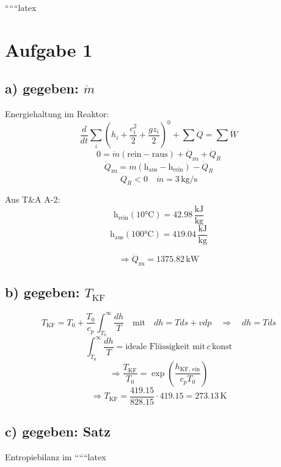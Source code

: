 
``````latex


\section*{Aufgabe 1}

\subsection*{a) gegeben: \( \dot{m} \)}

Energiehaltung im Reaktor:
\[
\frac{d}{dt} \sum_i (h_i + \frac{c_i^2}{2} + \frac{g z_i}{2})^0 + \sum \dot{Q} = \sum \dot{W}
\]
\[
0 = \dot{m} (\text{rein} - \text{raus}) + \dot{Q}_{\text{zu}} + \dot{Q}_R
\]
\[
\dot{Q}_{\text{zu}} = \dot{m} (\text{h}_{\text{aus}} - \text{h}_{\text{rein}}) - \dot{Q}_R
\]
\[
\dot{Q}_R < 0 \quad \dot{m} = 3 \, \text{kg/s}
\]

Aus T\&A A-2:
\[
\text{h}_{\text{rein}} (\text{10°C}) = 42.98 \, \frac{\text{kJ}}{\text{kg}}
\]
\[
\text{h}_{\text{aus}} (\text{100°C}) = 419.04 \, \frac{\text{kJ}}{\text{kg}}
\]

\[
\Rightarrow \dot{Q}_{\text{zu}} = 1375.82 \, \text{kW}
\]

\subsection*{b) gegeben: \( T_{\text{KF}} \)}

\[
T_{\text{KF}} = T_{\text{0}} + \frac{T_{\text{0}}}{c_p} \int_{T_{\text{0}}}^{\infty} \frac{dh}{T} \quad \text{mit} \quad dh = T ds + v dp \quad \Rightarrow \quad dh = T ds
\]
\[
\int_{T_{\text{0}}}^{\infty} \frac{dh}{T} = \text{ideale Flüssigkeit mit} \, c \, \text{konst}
\]
\[
\Rightarrow \frac{T_{\text{KF}}}{T_{\text{0}}} = \exp \left( \frac{h_{\text{KF, ein}}}{c_p T_{\text{0}}} \right)
\]
\[
\Rightarrow T_{\text{KF}} = \frac{419.15}{828.15} \cdot 419.15 = 273.13 \, \text{K}
\]

\subsection*{c) gegeben: Satz}

Entropiebilanz im
``````latex


